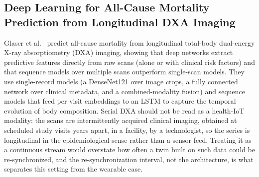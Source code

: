 \documentclass[journal]{IEEEtran}
\begin{document}
\subsection{Deep Learning for All-Cause Mortality Prediction from Longitudinal DXA Imaging}

Glaser et al.~\cite{glaser2022deep} predict all-cause mortality from longitudinal total-body dual-energy X-ray absorptiometry (DXA) imaging, showing that deep networks extract predictive features directly from raw scans (alone or with clinical risk factors) and that sequence models over multiple scans outperform single-scan models. They use single-record models (a DenseNet121 over image crops, a fully connected network over clinical metadata, and a combined-modality fusion) and sequence models that feed per visit embeddings to an LSTM to capture the temporal evolution of body composition. Serial DXA should not be read as a health-IoT modality: the scans are intermittently acquired clinical imaging, obtained at scheduled study visits years apart, in a facility, by a technologist, so the series is longitudinal in the epidemiological sense rather than a sensor feed. Treating it as a continuous stream would overstate how often a twin built on such data could be re-synchronized, and the re-synchronization interval, not the architecture, is what separates this setting from the wearable case.


\fi
\end{document}
